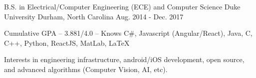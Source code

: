\begin{cventries}
  \cventry
    {B.S. in Electrical/Computer Engineering (ECE) and Computer Science}
    {Duke University}
    {Durham, North Carolina}
    {Aug. 2014 - Dec. 2017}
    {
      \begin{cvitems}
        \item {Cumulative GPA -- 3.881/4.0 -- Knows C\#, Javascript (Angular/React), Java, C, C++, Python, ReactJS, MatLab, LaTeX}
        \item {Interests in engineering infrastructure, android/iOS development, open source, and advanced algorithms (Computer Vision, AI, etc).}
      \end{cvitems}
    }
\end{cventries}
